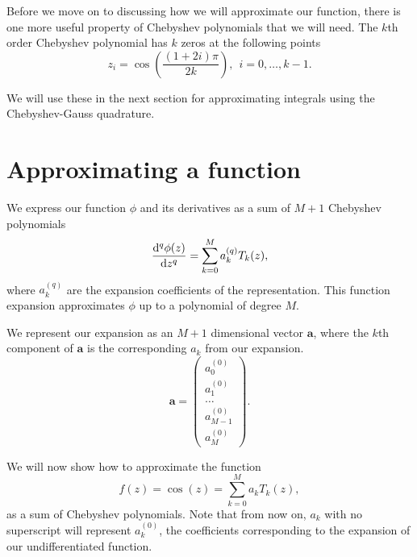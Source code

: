 Before we move on to discussing how we will approximate our function, there is one more useful property of Chebyshev polynomials that we will need. The $k$th order Chebyshev polynomial has $ k $ zeros at the following points \citep{canuto2007spectral}
\begin{equation}
    z_i = \cos(\frac{(1+2i) \pi}{2 k}),\ \ i = 0, \dots, k - 1.
    \label{chebyzeros}
\end{equation}

We will use these in the next section for approximating integrals using the Chebyshev-Gauss quadrature.


\section{Approximating a function}
We express our function $ \phi $ and its derivatives as a sum of $ M + 1 $ Chebyshev polynomials
\begin{equation}
    \dv[q]{\phi(z)}{z} = \sum^M_{k=0} a_k^{(q)} T_k(z),
    \label{expansion}
\end{equation}
where $ a_k^{(q)} $ are the expansion coefficients of the representation. This function expansion approximates $ \phi $ up to a polynomial of degree $ M $.

We represent our expansion as an $ M + 1 $ dimensional vector $ \mathbf{a} $, where the $k$th component of $ \mathbf{a} $ is the corresponding $ a_k $ from our expansion.
\begin{equation}
    \mathbf{a} = \begin{pmatrix}
        a_0^{(0)} \\
        a_1^{(0)} \\
        \dots \\
        a_{M-1}^{(0)} \\
        a_M^{(0)}
    \end{pmatrix}.
    \label{coeffvec}
\end{equation}

We will now show how to approximate the function
\begin{equation}
    f(z) = \cos(z) = \sum^M_{k=0} a_k T_k(z),
    \label{cos}
\end{equation}
as a sum of Chebyshev polynomials. Note that from now on, $ a_k$ with no superscript will represent $ a_k^{(0)} $, the coefficients corresponding to the expansion of our undifferentiated function.

